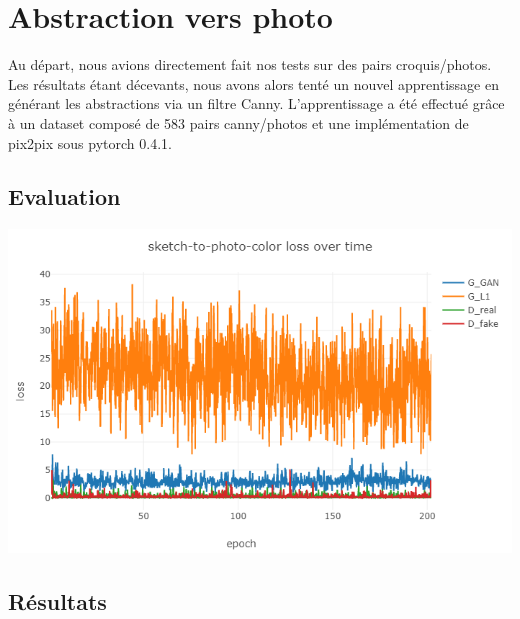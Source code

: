 \documentclass[a4paper, 12pt]{report}
\begin{document}
\pagebreak

\section{Abstraction vers photo}

Au départ, nous avions directement fait nos tests sur des pairs croquis/photos. Les résultats étant décevants, nous avons alors tenté un nouvel apprentissage en générant les abstractions via un filtre Canny. L'apprentissage a été effectué grâce à un dataset composé de 583 pairs canny/photos et une implémentation de pix2pix sous pytorch 0.4.1.

\subsection{Evaluation}
\begin{center}
  \centering
    \includegraphics[width=0.9\linewidth]{images/plot-pix2pix.png}
\end{center}

\subsection{Résultats}

\vspace*{\baselineskip}
\end{document}
